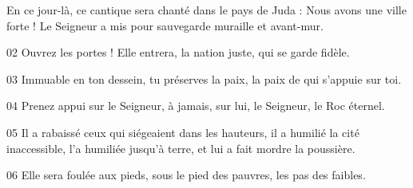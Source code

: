 En ce jour-là, ce cantique sera chanté dans le pays de Juda : Nous avons une ville forte ! Le Seigneur a mis pour sauvegarde muraille et avant-mur.

02 Ouvrez les portes ! Elle entrera, la nation juste, qui se garde fidèle.

03 Immuable en ton dessein, tu préserves la paix, la paix de qui s’appuie sur toi.

04 Prenez appui sur le Seigneur, à jamais, sur lui, le Seigneur, le Roc éternel.

05 Il a rabaissé ceux qui siégeaient dans les hauteurs, il a humilié la cité inaccessible, l’a humiliée jusqu’à terre, et lui a fait mordre la poussière.

06 Elle sera foulée aux pieds, sous le pied des pauvres, les pas des faibles.
